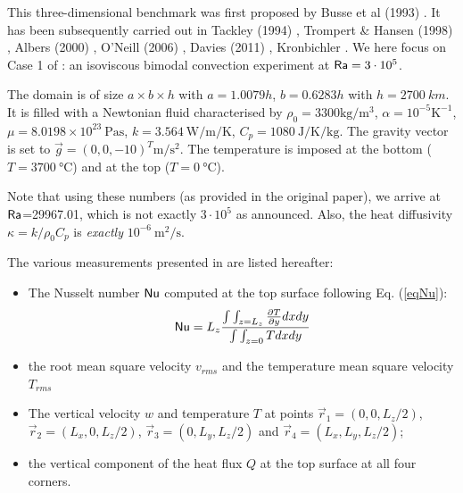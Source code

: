 


This three-dimensional benchmark was first proposed by Busse et al (1993) \cite{bucc94}. 
It has been subsequently carried out in Tackley (1994) \cite{tack94},
Trompert \& Hansen (1998) \cite{trha98}, Albers (2000) \cite{albe00},
O'Neill \etal (2006) \cite{onmm06}, Davies \etal (2011) \cite{dawk11}, Kronbichler \etal \cite{krhb12}.
We here focus on Case 1 of \cite{bucc94}:  an isoviscous bimodal convection experiment at ${\mathsf{Ra}}=3\cdot 10^5$.

The domain is of size $a\times b\times h$ with $a=1.0079h$, $b=0.6283h$ 
with $h=\SI{2700}{km}$. It is filled with a Newtonian fluid 
characterised by $\rho_0=3300\si{\kg\per\cubic\meter}$, $\alpha=10^{-5}\si{\kelvin}^{-1}$, 
$\mu=8.0198\times10^{23}~\si{\pascal\second}$, 
$k=3.564~\si{\watt\per\meter\per\kelvin}$, 
$C_p=1080~\si{\joule\per\kelvin\per\kg}$.
The gravity vector is set to $\vec{g}=(0,0,-10)^T\si{\meter\per\square\second}$.
The temperature is imposed at the bottom  ($T=3700~\si{\celsius}$) and at the top ($T=0~\si{\celsius}$).

Note that using these numbers (as provided in the original paper), we arrive at ${\mathsf{Ra}}$=29967.01, which 
is not exactly $3\cdot10^5$ as announced. Also, the heat diffusivity $\kappa=k/\rho_0 C_p$ is 
{\it exactly} $10^{-6}~\si{\square\meter\per\second}$.

The various measurements presented in \cite{bucc94} are listed hereafter:
\begin{itemize}
\item The Nusselt number ${\mathsf{Nu}}$ computed at the top surface following Eq. (\ref{eqNu}):
\[
{\mathsf{Nu}} = L_z \frac{\int\int_{z=L_z} \frac{\partial T}{\partial y} dx dy  }{\int \int_{z=0} T dx dy}
\]
\item the root mean square velocity $v_{rms}$ and the temperature mean square velocity $T_{rms}$
\item The vertical velocity $w$ and temperature $T$ at points $\vec{r}_1=(0,0,L_z/2)$, 
$\vec{r}_2=(L_x,0,L_z/2)$,
$\vec{r}_3=(0,L_y,L_z/2)$ and $\vec{r}_4=(L_x,L_y,L_z/2)$;
\item the vertical component of the heat flux $Q$ at the top surface  at all four corners. 
\end{itemize}

